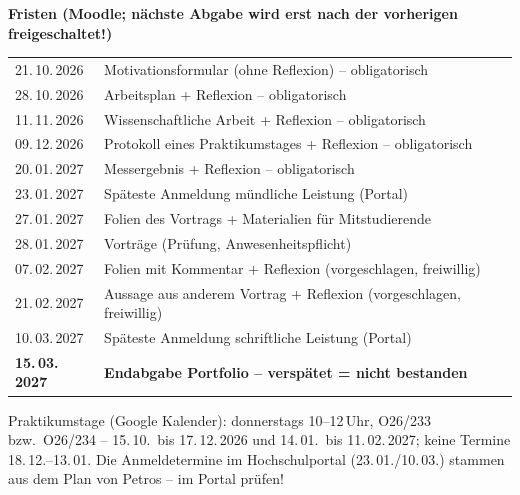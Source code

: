 
\textbf{Fristen (Moodle; nächste Abgabe wird erst nach der vorherigen freigeschaltet!)}\par\smallskip
{\small\begin{tabular}{@{}ll@{}}
21.\,10.\,2026 & Motivationsformular (ohne Reflexion) -- obligatorisch\\
28.\,10.\,2026 & Arbeitsplan + Reflexion -- obligatorisch\\
11.\,11.\,2026 & Wissenschaftliche Arbeit + Reflexion -- obligatorisch\\
09.\,12.\,2026 & Protokoll eines Praktikumstages + Reflexion -- obligatorisch\\
20.\,01.\,2027 & Messergebnis + Reflexion -- obligatorisch\\
23.\,01.\,2027 & Späteste Anmeldung mündliche Leistung (Portal)\\
27.\,01.\,2027 & Folien des Vortrags + Materialien für Mitstudierende\\
28.\,01.\,2027 & Vorträge (Prüfung, Anwesenheitspflicht)\\
07.\,02.\,2027 & Folien mit Kommentar + Reflexion (vorgeschlagen, freiwillig)\\
21.\,02.\,2027 & Aussage aus anderem Vortrag + Reflexion (vorgeschlagen, freiwillig)\\
10.\,03.\,2027 & Späteste Anmeldung schriftliche Leistung (Portal)\\
\textbf{15.\,03.\,2027} & \textbf{Endabgabe Portfolio -- verspätet = nicht bestanden}\\
\end{tabular}}\par\smallskip
{\small Praktikumstage (Google Kalender): donnerstags 10--12\,Uhr, O26/233 bzw.\ O26/234 --
15.\,10.\ bis 17.\,12.\,2026 und 14.\,01.\ bis 11.\,02.\,2027; keine Termine 18.\,12.--13.\,01.
Die Anmeldetermine im Hochschulportal (23.\,01./10.\,03.) stammen aus dem Plan von Petros -- im Portal prüfen!}
\par\medskip


